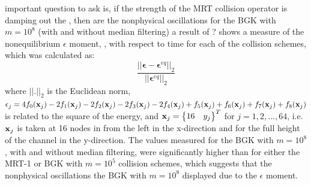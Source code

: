 \DIFdelbegin {}\DIFdelend \DIFaddbegin {}\DIFaddend important question to ask is, if the strength of the MRT collision operator is damping out the \DIFdelbegin {}\DIFdelend \DIFaddbegin {}\DIFaddend , then are the nonphysical oscillations for the BGK with $m = 10^8$ (with and without median filtering) a result of \DIFdelbegin {}\DIFdelend \DIFaddbegin {}\DIFaddend ?
 shows a measure of the nonequilibrium $\epsilon$ moment, \DIFdelbegin {}\DIFdelend \DIFaddbegin {}\DIFaddend , with respect to time for each of the collision schemes, which was calculated as:
\begin{equation}
\frac{||\boldsymbol{\epsilon} - \boldsymbol{\epsilon}^{eq}||_2}{||\boldsymbol{\epsilon}^{eq}||_2}
\end{equation}
\noindent where $||.||_2$ is the Euclidean norm, $\epsilon_j = 4f_0(\mathbf{x}_j) - 2f_1(\mathbf{x}_j) - 2f_2(\mathbf{x}_j) - 2f_3(\mathbf{x}_j) - 2f_4(\mathbf{x}_j) + f_5(\mathbf{x}_j) + f_6(\mathbf{x}_j) + f_7(\mathbf{x}_j) + f_8(\mathbf{x}_j)$ is related to the square of the energy, and $\mathbf{x}_j = \begin{Bmatrix}16 & y_j\end{Bmatrix}^T$ for $j = 1, 2, ..., 64$, i.e. $\mathbf{x}_j$ is taken at 16 nodes in from the left in the x-direction and for the full height of the channel in the y-direction.
The values measured for the BGK with $m = 10^8$, with and without median filtering, were significantly higher than for either the MRT-1 or BGK with $m = 10^5$ collision schemes, which suggests that the nonphysical oscillations the BGK with $m = 10^8$ displayed \DIFdelbegin {}\DIFdelend \DIFaddbegin {}\DIFaddend due to the $\epsilon$ moment.

